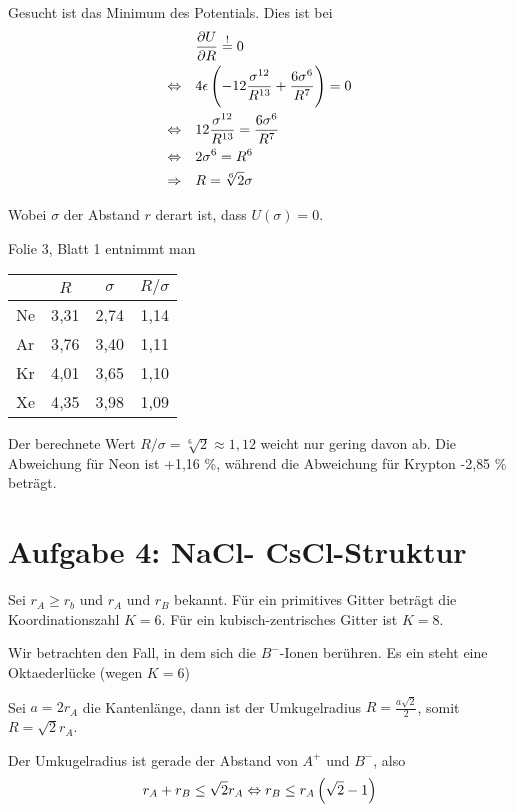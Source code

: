 \documentclass[a4paper,german,12pt,smallheadings]{scrartcl}
\begin{document}
\begin{enumerate}[a)]
    Gesucht ist das Minimum des Potentials. Dies ist bei
    \begin{align}
      &\frac{\partial U}{\partial R} \overset{!}{=} 0 \\
      \Leftrightarrow \quad &
      4 \epsilon \del{-12\frac{\sigma^{12}}{R^{13}} + \frac{6\sigma^6}{R^7}} = 0 \\
      \Leftrightarrow \quad &
      12\frac{\sigma^{12}}{R^{13}} = \frac{6\sigma^6}{R^7} \\
      \Leftrightarrow \quad &
      2 \sigma^6 = R^6 \\
      \Rightarrow \quad & R = \sqrt[6]{2} \sigma
    \end{align}

    Wobei $\sigma$ der Abstand $r$ derart ist, dass $U(\sigma) = 0$.

    Folie 3, Blatt 1 entnimmt man

    \begin{tabular}{l|c|c|c}
      & $R$ & $\sigma$ & $R/\sigma$ \\
      \hline
      Ne & 3{,}31 & 2{,}74 & 1{,}14 \\
      Ar & 3{,}76 & 3{,}40 & 1{,}11 \\
      Kr & 4{,}01 & 3{,}65 & 1{,}10 \\
      Xe & 4{,}35 & 3{,}98 & 1{,}09
    \end{tabular}

    Der berechnete Wert $R/\sigma = \sqrt[6]{2} \approx 1{,}12$ weicht
    nur gering davon ab. Die Abweichung für Neon ist +1{,}16 \%, während die
    Abweichung für Krypton -2{,}85 \% beträgt.
\end{enumerate}

\section*{Aufgabe 4: NaCl- CsCl-Struktur}

Sei $r_A \ge r_b$ und $r_A$ und $r_B$ bekannt. Für ein primitives Gitter
beträgt die Koordinationszahl $K = 6$. Für ein kubisch-zentrisches Gitter ist
$K=8$.

Wir betrachten den Fall, in dem sich die $B^-$-Ionen berühren. Es ein steht
eine Oktaederlücke (wegen $K = 6$)

Sei $a = 2 r_A$ die Kantenlänge, dann ist der Umkugelradius $R = \frac{a
\sqrt{2}}{2}$, somit $R = \sqrt{2} r_A$.

Der Umkugelradius ist gerade der Abstand von $A^+$ und $B^-$, also
\begin{equation}
  r_A + r_B \le \sqrt{2} r_A \Leftrightarrow r_B \le r_A \del{\sqrt{2} - 1}
\end{equation}
\end{document}
